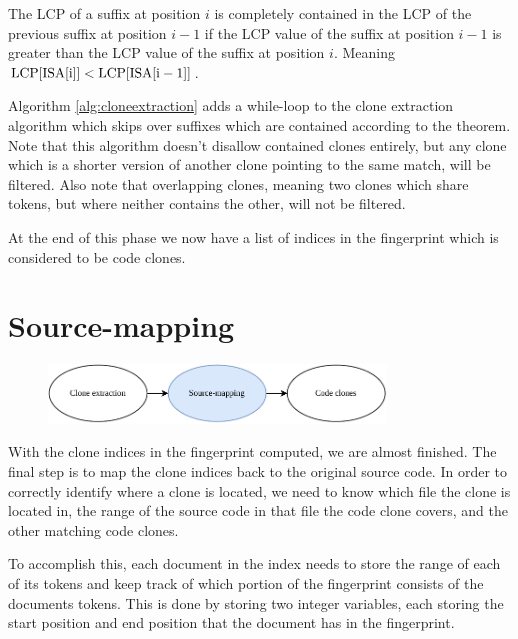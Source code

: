 \begin{theorem} 

    The LCP of a suffix at position $i$ is completely contained in the LCP of the previous
    suffix at position $i - 1$ if the LCP value of the suffix at position $i - 1$ is
    greater than the LCP value of the suffix at position $i$. Meaning $\mathrm{LCP}[{\mathrm{ISA}[{\mathrm{i}}]}]
    < \mathrm{LCP}[{\mathrm{ISA}[{\mathrm{i} - 1}]}]$.


\end{theorem}


Algorithm \ref{alg:cloneextraction} adds a while-loop to the clone extraction algorithm
which skips over suffixes which are contained according to the theorem. Note that this
algorithm doesn't disallow contained clones entirely, but any clone which is a shorter
version of another clone pointing to the same match, will be filtered. Also note that
overlapping clones, meaning two clones which share tokens, but where neither contains the
other, will not be filtered.

At the end of this phase we now have a list of indices in the fingerprint which is
considered to be code clones.

\section{Source-mapping}

\begin{figure}[H]
    \begin{center}
        \includegraphics[width=0.8\textwidth]{figures/phases/phases_sourcemap.drawio.pdf}
    \end{center}
\end{figure}

With the clone indices in the fingerprint computed, we are almost finished. The final step
is to map the clone indices back to the original source code. In order to correctly
identify where a clone is located, we need to know which file the clone is located in, the
range of the source code in that file the code clone covers, and the other matching code
clones.

To accomplish this, each document in the index needs to store the range of each of its
tokens and keep track of which portion of the fingerprint consists of the documents
tokens. This is done by storing two integer variables, each storing the start position and
end position that the document has in the fingerprint. 

